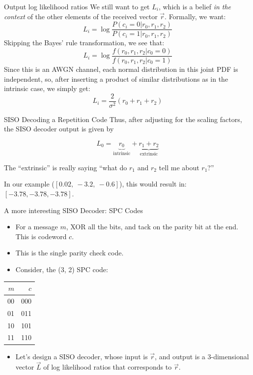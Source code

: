 \documentclass[aspectratio=1610, 10pt]{beamer}
\begin{document}
\begin{frame}[label={sec:orgb06214a}]{Output log likelihood ratios}
We still want to get \(L_i\), which is a belief \emph{in the context} of the
other elements of the received vector \(\vec{r}\). Formally, we want:
$$L_i = \log{\frac{P(c_i=0|r_0,r_1,r_2)}{P(c_i=1|r_0,r_1,r_2)}}$$
Skipping the Bayes' rule transformation, we see that:
$$L_i = \log{\frac{f(r_0,r_1,r_2|c_{0}=0)}{f(r_0,r_1,r_2|c_{0}=1)}}$$
Since this is an AWGN channel, each normal distribution in this joint
PDF is independent, so, after inserting a product of similar
distributions as in the intrinsic case, we simply
get:
$$L_i = \frac{2}{\sigma^2}(r_0+r_1+r_2)$$
\end{frame}

\begin{frame}[label={sec:org06dfd30}]{SISO Decoding a Repetition Code}
Thus, after adjusting for the scaling factors, the SISO decoder output
is given by

$$L_0 = \underbrace{r_0}_{\text{intrinsic}} + \underbrace{r_1 +
r_2}_{\text{extrinsic}}$$

The ``extrinsic'' is really saying ``what do \(r_1\) and \(r_2\) tell me
about \(r_1\)?''

In our example (\([0.02,~-3.2,~-0.6]\)), this would result in:
\([-3.78,-3.78,-3.78]\).
\end{frame}

\begin{frame}[label={sec:org728be53}]{A more interesting SISO Decoder: SPC Codes}
\begin{itemize}
\item For a message \(m\), XOR all the bits, and tack on the parity bit at
the end. This is codeword \(c\).
\item This is the \alert{single parity check code}.
\item Consider, the (3, 2) SPC code:
\end{itemize}

\begin{center}
\begin{tabular}{rr}
\toprule
\(m\) & \(c\)\\
\midrule
00 & 000\\
01 & 011\\
10 & 101\\
11 & 110\\
\bottomrule
\end{tabular}

\end{center}

\begin{itemize}
\item Let's design a SISO decoder, whose input is \(\vec{r}\), and output is
a 3-dimensional vector \(\vec{L}\) of log likelihood ratios that
corresponds to \(\vec{r}\).
\end{itemize}
\end{frame}
\end{document}
